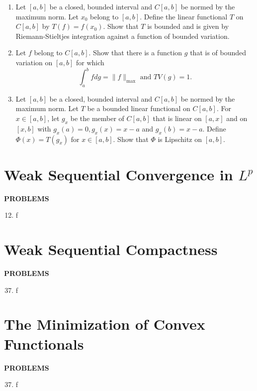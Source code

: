 \begin{enumerate}
    \item Let $[a,b]$ be a closed, bounded interval and $C[a,b]$ be normed by the maximum norm. Let $x_0$ belong to $[a,b]$. Define the linear functional $T$ on $C[a,b]$ by $T(f)=f(x_0)$. Show that $T$ is bounded and is given by Riemann-Stieltjes integration against a function of bounded variation.
    \item Let $f$ belong to $C[a,b]$. Show that there is a function $g$ that is of bounded variation on $[a,b]$ for which 
    \[
        \int_a^bfdg=\|f\|_{\max}\text{ and }TV(g)=1.  
    \]
    \item Let $[a,b]$ be a closed, bounded interval and $C[a,b]$ be normed by the maximum norm. Let $T$ be a bounded linear functional on $C[a,b]$.
    For $x\in[a,b]$, let $g_x$ be the member of $C[a,b]$ that is linear on $[a,x]$ and on $[x,b]$ with $g_x(a)=0,g_x(x)=x-a$ and $g_x(b)=x-a$. Define $\Phi(x)=T(g_x)$ for $x\in[a,b]$. Show that $\Phi$ is Lipschitz on $[a,b]$.
\end{enumerate}

\section{Weak Sequential Convergence in $L^p$}
\begin{center}
	\textbf{PROBLEMS}
\end{center}
\begin{enumerate}
	\setcounter{enumi}{11}
    \item f
\end{enumerate}

\section{Weak Sequential Compactness}
\begin{center}
	\textbf{PROBLEMS}
\end{center}
\begin{enumerate}
	\setcounter{enumi}{36}
    \item f
\end{enumerate}

\section{The Minimization of Convex Functionals}
\begin{center}
	\textbf{PROBLEMS}
\end{center}
\begin{enumerate}
	\setcounter{enumi}{36}
    \item f
\end{enumerate}